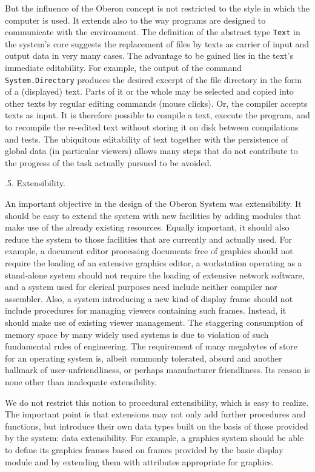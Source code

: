 But the influence of the Oberon concept is not restricted to the style
in which the computer is used. It extends also to the way programs are
designed to communicate with the environment. The definition of the
abstract type {\tt Text} in the system's core suggests the replacement
of files by texts as carrier of input and output data in very many
cases. The advantage to be gained lies in the text's immediate
editability. For example, the output of the command {\tt System.Directory}
produces the desired excerpt of the file directory
in the form of a (displayed) text. Parts of it or the whole may be
selected and copied into other texts by regular editing commands
(mouse clicks). Or, the compiler accepts texts as input. It is
therefore possible to compile a text, execute the program, and to
recompile the re-edited text without storing it on disk between
compilations and tests. The ubiquitous editability of text together
with the persistence of global data (in particular viewers) allows
many steps that do not contribute to the progress of the task actually
pursued to be avoided.

.5. Extensibility.

An important objective in the design of the Oberon System was
extensibility. It should be easy to extend the system with new
facilities by adding modules that make use of the already existing
resources. Equally important, it should also reduce the system to
those facilities that are currently and actually used. For example, a
document editor processing documents free of graphics should not
require the loading of an extensive graphics editor, a workstation
operating as a stand-alone system should not require the loading of
extensive network software, and a system used for clerical purposes
need include neither compiler nor assembler. Also, a system
introducing a new kind of display frame should not include procedures
for managing viewers containing such frames. Instead, it should make
use of existing viewer management. The staggering consumption of
memory space by many widely used systems is due to violation of such
fundamental rules of engineering. The requirement of many megabytes of
store for an operating system is, albeit commonly tolerated, absurd
and another hallmark of user-unfriendliness, or perhaps manufacturer
friendliness. Its reason is none other than inadequate extensibility.

We do not restrict this notion to procedural extensibility, which is
easy to realize. The important point is that extensions may not only
add further procedures and functions, but introduce their own data
types built on the basis of those provided by the system: data
extensibility. For example, a graphics system should be able to define
its graphics frames based on frames provided by the basic display
module and by extending them with attributes appropriate for graphics.


